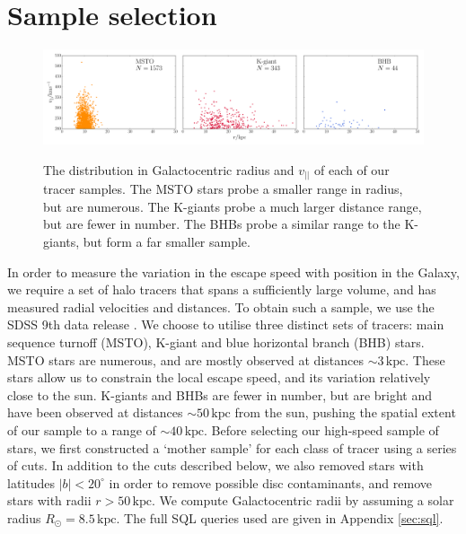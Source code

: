 \documentclass[useAMS,twocolumn,usenatbib]{mn2e}
\def\kpc{{\,\mathrm{kpc}}}
\def\vlos{{v_{||}}}
\begin{document}
\section{Sample selection}

\label{sec:samples}

\begin{figure}
\includegraphics[width=2\columnwidth]{plots/tracer_distributions}\\
\caption{The distribution in Galactocentric radius and $\vlos$ of each
  of our tracer samples. The MSTO stars probe a smaller range in
  radius, but are numerous. The K-giants probe a much larger distance
  range, but are fewer in number. The BHBs probe a similar range to
  the K-giants, but form a far smaller sample.}
\label{fig:data}
\end{figure}


In order to measure the variation in the escape speed with position in
the Galaxy, we require a set of halo tracers that spans a sufficiently
large volume, and has measured radial velocities and distances. To
obtain such a sample, we use the SDSS 9th data release
\citep{Ah12}. We choose to utilise three distinct sets of tracers:
main sequence turnoff (MSTO), K-giant and blue horizontal branch (BHB)
stars. MSTO stars are numerous, and are mostly observed at distances
$\sim 3\kpc$. These stars allow us to constrain the local escape
speed, and its variation relatively close to the sun. K-giants and
BHBs are fewer in number, but are bright and have been observed at
distances $\sim 50\kpc$ from the sun, pushing the spatial extent of
our sample to a range of $\sim 40\kpc$. Before selecting our
high-speed sample of stars, we first constructed a `mother sample' for
each class of tracer using a series of cuts. In addition to the cuts
described below, we also removed stars with latitudes $|b| < 20^\circ$
in order to remove possible disc contaminants, and remove stars with
radii $r>50\kpc$. We compute Galactocentric radii by assuming a solar
radius $R_\odot = 8.5\kpc$. The full {\sc SQL} queries used are given
in Appendix \ref{sec:sql}.
\end{document}
